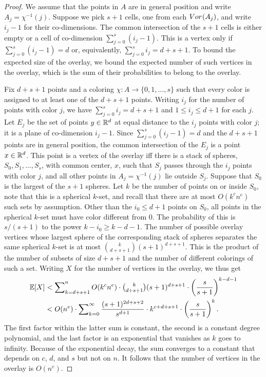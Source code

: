 \documentclass[a4paper]{article}
\newcommand {\mm}[1]   {\ifmmode{#1}\else{\mbox{\(#1\)}}\fi}
\newcommand{\Rspace}        {\mm{{\mathbb R}}}
\newcommand{\Voronoi}[2]    {\mm{{\rm Vor}_{#1}{({#2})}}}
\newcommand{\Exp}[1]        {\mm{{\mathbb E}{[{#1}]}}}
\theoremstyle{definition}
\numberwithin{theorem}{section}
\numberwithin{equation}{section}
\begin{document}
\begin{proof}
  We assume that the points in $A$ are in general position and write $A_j = \chi^{-1} (j)$.
  Suppose we pick $s+1$ cells, one from each $\Voronoi{}{A_j}$, and write $i_j - 1$ for their co-dimensions.
  The common intersection of the $s+1$ cells is either empty or a cell of co-dimension $\sum_{j=0}^s(i_j - 1)$.
  This is a vertex only if $\sum_{j=0}^s (i_j-1) = d$ or, equivalently, $\sum_{j=0}^s i_j = d+s+1$.
  To bound the expected size of the overlay, we bound the expected number of such vertices in the overlay, which is the sum of their probabilities to belong to the overlay.
  
  \medskip
  Fix $d+s+1$ points and a coloring $\chi \colon A \to \{0, 1, \ldots, s\}$ such that every color is assigned to at least one of the $d+s+1$ points.
  Writing $i_j$ for the number of points with color $j$, we have $\sum_{j=0}^s i_j = d+s+1$ and $1 \leq i_j \leq d+1$ for each $j$.
  Let $E_j$ be the set of points $y \in \Rspace^d$ at equal distance to the $i_j$ points with color $j$; it is a plane of co-dimension $i_j - 1$.
  Since $\sum_{j=0}^s (i_j - 1) = d$ and the $d+s+1$ points are in general position, the common intersection of the $E_j$ is a point $x \in \Rspace^d$.
  This point is a vertex of the overlay iff there is a stack of spheres, $S_0, S_1, \ldots, S_s$, with common center, $x$, such that $S_j$ passes through the $i_j$ points with color $j$, and all other points in $A_j = \chi^{-1} (j)$ lie outside $S_j$.
  Suppose that $S_0$ is the largest of the $s+1$ spheres.
  Let $k$ be the number of points on or inside $S_0$, note that this is a spherical $k$-set, and recall that there are at most $O(k^c n^e)$ such sets by assumption.
  Other than the $i_0 \leq d+1$ points on $S_0$, all points in the spherical $k$-set must have color different from $0$.
  The probability of this is $s/(s+1)$ to the power $k-i_0 \geq k-d-1$.
  The number of possible overlay vertices whose largest sphere of the corresponding stack of spheres separates the same spherical $k$-set is at most $\binom{k}{d+s+1} (s+1)^{d+s+1}$. This is the product of the number of subsets of size $d+s+1$ and the number of different colorings of such a set.
  Writing $X$ for the number of vertices in the overlay, we thus get
  \begin{align}
    \Exp{X} &< \sum\nolimits_{k=d+s+1}^n O(k^c n^e) \cdot \tbinom{k}{d+s+1} (s+1)^{d+s+1} \cdot \left( \frac{s}{s+1} \right)^{k-d-1} \\
    &< O(n^e) \cdot \sum\nolimits_{k=0}^\infty \frac{(s+1)^{2d+s+2}}{s^{d+1}} \cdot k^{c+d+s+1} \cdot \left( \frac{s}{s+1} \right)^{k} .
  \end{align}
  The first factor within the latter sum is constant, the second is a constant degree polynomial, and the last factor is an exponential that vanishes as $k$ goes to infinity.
  Because of the exponential decay, the sum converges to a constant that depends on $c$, $d$, and $s$ but not on $n$.
  It follows that the number of vertices in the overlay is $O(n^e)$.
  

\end{proof}
\end{document}
